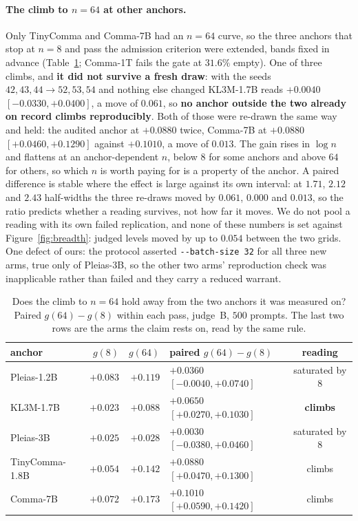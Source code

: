 \paragraph{The climb to $n=64$ at other anchors.}
Only TinyComma and Comma-7B had an $n=64$ curve, so the three anchors that stop at $n=8$ and pass the
admission criterion were extended, bands fixed in advance (Table~\ref{tab:climb}; Comma-1T fails the gate
at $31.6\%$ empty). One of three climbs, and \textbf{it did not survive a fresh draw}: with the seeds
$42,43,44 \rightarrow 52,53,54$ and nothing else changed KL3M-1.7B reads $+0.0040$ $[-0.0330, +0.0400]$,
a move of $0.061$, so \textbf{no anchor outside the two already on record climbs reproducibly}. Both of
those were re-drawn the same way and held: the audited anchor at $+0.0880$ twice, Comma-7B at $+0.0880$
$[+0.0460, +0.1290]$ against $+0.1010$, a move of $0.013$. The gain rises in $\log n$ and flattens at an
anchor-dependent $n$, below $8$ for some anchors and above $64$ for others, so which $n$ is worth paying
for is a property of the anchor. A paired difference is stable where the effect is large against its own
interval: at $1.71$, $2.12$ and $2.43$ half-widths the three re-draws moved by $0.061$, $0.000$ and
$0.013$, so the ratio predicts whether a reading survives, not how far it moves. We do not pool a reading
with its own failed replication, and none of these numbers is set against Figure~\ref{fig:breadth}:
judged levels moved by up to $0.054$ between the two grids. One defect of ours: the protocol asserted \texttt{-{}-batch-size 32}
for all three new arms, true only of Pleias-3B, so the other two arms' reproduction check was inapplicable rather than failed and they carry a
reduced warrant.

\begin{table}[ht]
\centering\footnotesize
\caption{Does the climb to $n=64$ hold away from the two anchors it was measured on? Paired
$g(64)-g(8)$ within each pass, judge~B, $500$ prompts. The last two rows are the arms the claim rests
on, read by the same rule.}\label{tab:climb}
\setlength{\tabcolsep}{5pt}
\begin{tabular}{@{}lrrlc@{}}
\toprule
anchor & $g(8)$ & $g(64)$ & paired $g(64)-g(8)$ & reading \\
\midrule
Pleias-1.2B & $+0.083$ & $+0.119$ & $+0.0360$ $[-0.0040, +0.0740]$ & saturated by $8$ \\
KL3M-1.7B & $+0.023$ & $+0.088$ & $\mathbf{+0.0650}$ $[+0.0270, +0.1030]$ & \textbf{climbs} \\
Pleias-3B & $+0.025$ & $+0.028$ & $+0.0030$ $[-0.0380, +0.0460]$ & saturated by $8$ \\
\midrule
TinyComma-1.8B & $+0.054$ & $+0.142$ & $+0.0880$ $[+0.0470, +0.1300]$ & climbs \\
Comma-7B & $+0.072$ & $+0.173$ & $+0.1010$ $[+0.0590, +0.1420]$ & climbs \\
\bottomrule
\end{tabular}
\end{table}


